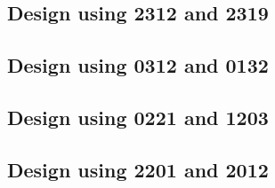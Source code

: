 \subsection{Design using 2312 and 2319}


 \begin{center}




 \end{center}



\subsection{Design using 0312 and 0132}


 \begin{center}




 \end{center}



\subsection{Design using 0221 and 1203}


 \begin{center}




 \end{center}



\subsection{Design using 2201 and 2012}


